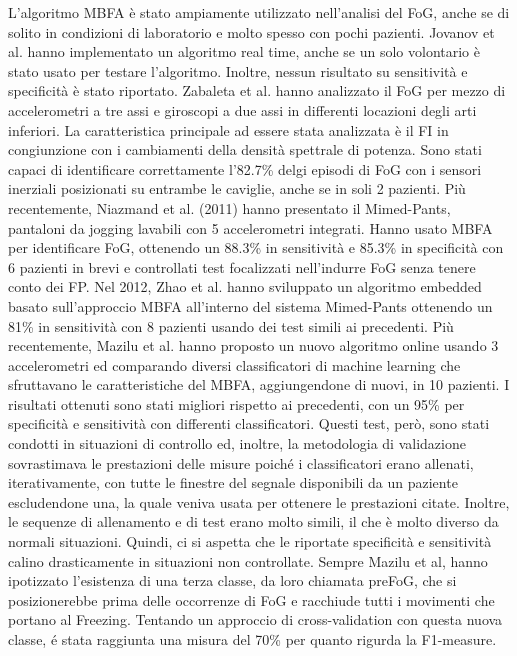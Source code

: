 L'algoritmo MBFA è stato ampiamente utilizzato nell'analisi del FoG, anche se di solito in condizioni di laboratorio e molto spesso con pochi pazienti. Jovanov et al. hanno implementato un algoritmo real time, anche se un solo volontario è stato usato per testare l'algoritmo. Inoltre, nessun risultato su sensitività e specificità è stato riportato\cite{22}. Zabaleta et al. hanno analizzato il FoG per mezzo di accelerometri a tre assi e giroscopi a due assi in differenti locazioni degli arti inferiori. La caratteristica principale ad essere stata analizzata è il FI in congiunzione con i cambiamenti della densità spettrale di potenza. Sono stati capaci di identificare correttamente l'82.7\% delgi episodi di FoG con i sensori inerziali posizionati su entrambe le caviglie, anche se in soli 2 pazienti\cite{24}.  \newline
Più recentemente, Niazmand et al. (2011) hanno presentato il Mimed-Pants\cite{26}, pantaloni da jogging lavabili con 5 accelerometri integrati. Hanno usato MBFA per identificare FoG, ottenendo un 88.3\% in sensitività e 85.3\% in specificità con 6 pazienti in brevi e controllati test focalizzati nell'indurre FoG senza tenere conto dei FP. Nel 2012, Zhao et al.\cite{46} hanno sviluppato un algoritmo embedded basato sull'approccio MBFA all'interno del sistema Mimed-Pants ottenendo un 81\% in sensitività con 8 pazienti usando dei test simili ai precedenti. Più recentemente, Mazilu et al. hanno proposto un nuovo algoritmo online usando 3 accelerometri ed comparando diversi classificatori di machine learning che sfruttavano le caratteristiche del MBFA, aggiungendone di nuovi, in 10 pazienti\cite{48}. I risultati ottenuti sono stati migliori rispetto ai precedenti, con un 95\% per specificità e sensitività con differenti classificatori. Questi test, però, sono stati condotti in situazioni di controllo ed, inoltre, la metodologia di validazione sovrastimava le prestazioni delle misure poiché i classificatori erano allenati, iterativamente, con tutte le finestre del segnale disponibili da un paziente escludendone una, la quale veniva usata per ottenere le prestazioni citate. Inoltre, le sequenze di allenamento e di test erano molto simili, il che è molto diverso da normali situazioni. Quindi, ci si aspetta che le riportate specificità e sensitività calino drasticamente in situazioni non controllate. Sempre Mazilu et al, hanno ipotizzato l'esistenza di una terza classe, da loro chiamata preFoG, che si posizionerebbe prima delle occorrenze di FoG e racchiude tutti i movimenti che portano al Freezing. Tentando un approccio di cross-validation con questa nuova classe, é stata raggiunta una misura del 70\% per quanto rigurda la F1-measure.\cite{12} \newline
